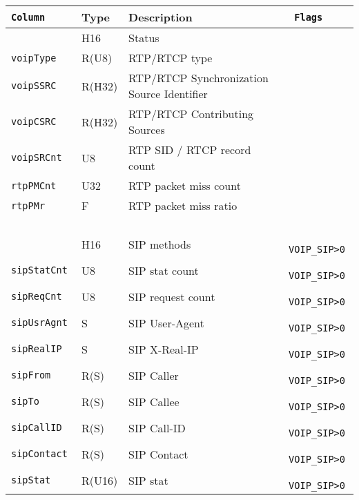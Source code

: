 \documentclass[documentation]{subfiles}
\begin{document}
\begin{longtable}{>{\tt}lll>{\tt\small}l}
    \toprule
    {\bf Column}         & {\bf Type} & {\bf Description} & {\bf Flags}\\
    \midrule\endhead%
    \nameref{voipStat}   & H16        & Status                                     & \\
    voipType             & R(U8)      & RTP/RTCP type                              & \\
    voipSSRC             & R(H32)     & RTP/RTCP Synchronization Source Identifier & \\
    voipCSRC             & R(H32)     & RTP/RTCP Contributing Sources              & \\
    voipSRCnt            & U8         & RTP SID / RTCP record count                & \\
    rtpPMCnt             & U32        & RTP packet miss count                      & \\
    rtpPMr               & F          & RTP packet miss ratio                      & \\
                         &            &                                            & \\
    \nameref{sipMethods} & H16        & SIP methods                                & VOIP\_SIP>0\\
    sipStatCnt           & U8         & SIP stat count                             & VOIP\_SIP>0\\
    sipReqCnt            & U8         & SIP request count                          & VOIP\_SIP>0\\
    sipUsrAgnt           & S          & SIP User-Agent                             & VOIP\_SIP>0\\
    sipRealIP            & S          & SIP X-Real-IP                              & VOIP\_SIP>0\\
    sipFrom              & R(S)       & SIP Caller                                 & VOIP\_SIP>0\\
    sipTo                & R(S)       & SIP Callee                                 & VOIP\_SIP>0\\
    sipCallID            & R(S)       & SIP Call-ID                                & VOIP\_SIP>0\\
    sipContact           & R(S)       & SIP Contact                                & VOIP\_SIP>0\\
    sipStat              & R(U16)     & SIP stat                                   & VOIP\_SIP>0\\

\end{longtable}
\end{document}
